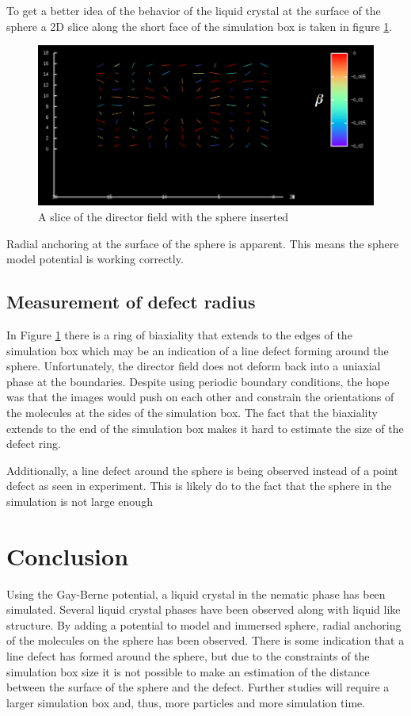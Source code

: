 \documentclass[preprint, aps]{revtex4-1}
\begin{document}
To get a better idea of the behavior of the liquid crystal at the surface of the
sphere a 2D slice along the short face of the simulation box is taken in figure
\ref{fig:biaxial-2d}.
	\begin{figure}[H]
		\includegraphics[width=\textwidth]{biaxial-2d.png}
		\caption{A slice of the director field with the sphere inserted}
		\label{fig:biaxial-2d}
	\end{figure}
Radial anchoring at the surface of the sphere is apparent. This means the sphere
model potential is working correctly.

\subsection*{Measurement of defect radius}
In Figure \ref{fig:biaxial-2d} there is a ring of biaxiality that extends to the
edges of the simulation box which may be an indication of a line defect forming
around the sphere. Unfortunately, the director field does not deform back into a
uniaxial phase at the boundaries. Despite using periodic boundary conditions,
the hope was that the images would push on each other and constrain the
orientations of the molecules at the sides of the simulation box. The fact that
the biaxiality extends to the end of the simulation box makes it hard to
estimate the size of the defect ring.

Additionally, a line defect around the sphere is being observed instead of a
point defect as seen in experiment. This is likely do to the fact that the
sphere in the simulation is not large enough \cite{lubensky98}

\section*{Conclusion}
Using the Gay-Berne potential, a liquid crystal in the nematic phase has been
simulated. Several liquid crystal phases have been observed along with liquid
like structure. By adding a potential to model and immersed sphere, radial
anchoring of the molecules on the sphere has been observed. There is some
indication that a line defect has formed around the sphere, but due to the
constraints of the simulation box size it is not possible to make an estimation
of the distance between the surface of the sphere and the defect. Further
studies will require a larger simulation box and, thus, more particles and more
simulation time. 
\end{document}
